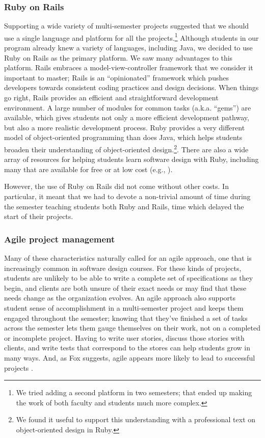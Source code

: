 
\subsubsection{Ruby on Rails}

Supporting a wide variety of multi-semester projects suggested that
we should use a single language and platform for all the
projects.\footnote{We tried adding a second platform in two
semesters; that ended up making the work of both faculty and students
much more complex.}  Although students in our program already knew
a variety of languages, including Java, we decided to use Ruby on
Rails as the primary platform.  We saw many advantages to this
platform. Rails embraces a model-view-controller framework that we
consider it important to master; Rails is an ``opinionated'' framework
which pushes developers towards consistent coding practices and
design decisions.  When things go right, Rails provides an efficient
and straightforward development environment.  A large number of
modules for common tasks (a.k.a. ``gems'') are available, which
gives students not only a more efficient development pathway, but
also a more realistic development process. Ruby provides a very
different model of object-oriented programming than does Java, which
helps students broaden their understanding of object-oriented
design.\footnote{We found it useful to support this understanding
with a professional text on object-oriented design in Ruby.\cite{poodr}}.
There are also a wide array of resources for helping students
learn software design with Ruby, including many that are available
for free or at low cost (e.g., \cite{saasbook,rails-tutorial}).

However, the use of Ruby on Rails did not come without other costs.  In
particular, it meant that we had to devote a non-trivial amount of
time during the semester teaching students both Ruby and Rails, time
which delayed the start of their projects.

\subsubsection{Agile project management}

Many of these characteristics naturally called for an agile approach,
one that is increasingly common in software design courses.  For
these kinds of projects, students are unlikely to be able to write
a complete set of specifications as they begin, and clients are
both unsure of their exact needs or may find that these needs change
as the organization evolves.  An agile approach also supports student
sense of accomplishment in a multi-semester project and keeps them
engaged throughout the semester; knowing that they've finished a
set of tasks across the semester lets them gauge themselves on their
work, not on a completed or incomplete project.  Having to write
user stories, discuss those stories with clients, and write tests
that correspond to the stores can help students grow in many ways.
And, as Fox suggests, agile appears more likely to lead to
successful projects \cite{fox-2014}.

